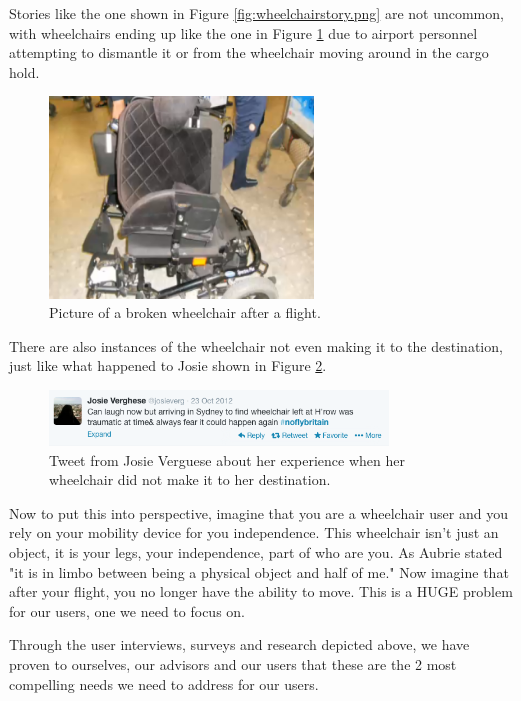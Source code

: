 Stories like the one shown in Figure \ref{fig:wheelchairstory.png} are not uncommon, with wheelchairs ending up like the one in Figure \ref{fig:brokenwheelchair.png} due to airport personnel attempting to dismantle it or from the wheelchair moving around in the cargo hold. 


\begin{figure}[h]
  \centering
     \includegraphics[width=7cm]{images/brokenwheelchair.png}
   \caption{Picture of a broken wheelchair after a flight.}
  \label{fig:brokenwheelchair.png}
\end{figure}

There are also instances of the wheelchair not even making it to the destination, just like what happened to Josie shown in Figure \ref{fig:leftwheelchair.png}. 

\begin{figure}[h]
  \centering
     \includegraphics[width=9cm]{images/leftwheelchair.png}
   \caption{Tweet from Josie Verguese about her experience when her wheelchair did not make it to her destination.}
  \label{fig:leftwheelchair.png}
\end{figure}

Now to put this into perspective, imagine that you are a wheelchair user and you rely on your mobility device for you independence. This wheelchair isn't just an object, it is your legs, your independence, part of who are you. As Aubrie stated "it is in limbo between being a physical object and half of me." Now imagine that after your flight, you no longer have the ability to move. This is a HUGE problem for our users, one we need to focus on. 


 Through  the user interviews, surveys and research depicted above, we have proven to ourselves, our advisors and our users that these are the 2 most compelling needs we need to address for our users. 


